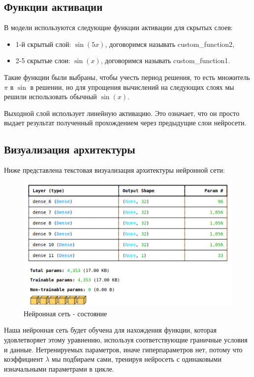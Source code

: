 \subsection{Функции активации}

В модели используются следующие функции активации для скрытых слоев:
\begin{itemize}
    \item 1-й скрытый слой: $\sin(5x)$, договоримся называть \textrm{custom\_function2},
    \item 2-5 скрытые слои: $\sin(x)$, договоримся называть \textrm{custom\_function1}.
\end{itemize}

Такие функции были выбраны, чтобы учесть период решения, то есть множитель $\pi$ в $\sin$ в решении, но для упрощения вычислений на следующих слоях мы решили использовать обычный $\sin(x)$.

Выходной слой использует линейную активацию. Это означает, что он просто выдает результат полученный прохождением через предыдущие слои нейросети.

\subsection{Визуализация архитектуры}

Ниже представлена текстовая визуализация архитектуры нейронной сети:
\begin{figure}[ht!]
\centering
\includegraphics[width=0.9\hsize]{images/visualization_1.png}
\caption{Нейронная сеть - состояние}
\label{fig:error}
\end{figure}

Наша нейронная сеть будет обучена для нахождения функции, которая удовлетворяет этому уравнению, используя соответствующие граничные условия и данные.
Нетренируемых параметров, иначе гиперпараметров нет, потому что коэффициент $\lambda$ мы подбираем сами, тренируя нейросеть с одинаковыми изначальными параметрами в цикле.
